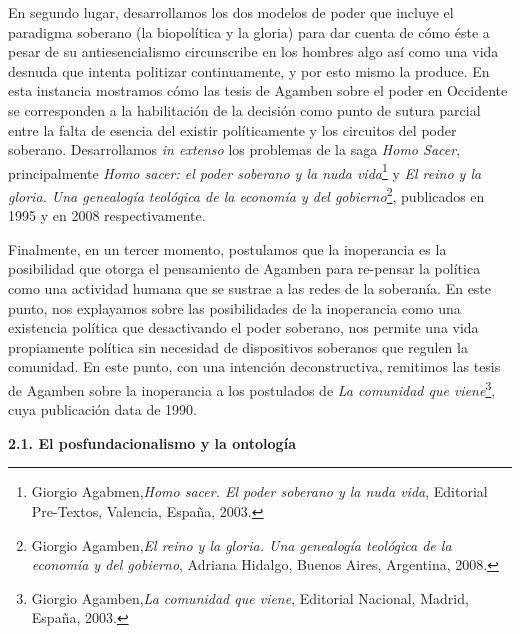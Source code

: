 \documentclass{book}
\begin{document}
En segundo lugar, desarrollamos los dos modelos de poder que incluye el
paradigma soberano (la biopolítica y la gloria) para dar cuenta de cómo
éste a pesar de su antiesencialismo circunscribe en los hombres algo así
como una vida desnuda que intenta politizar continuamente, y por esto
mismo la produce. En esta instancia mostramos cómo las tesis de Agamben
sobre el poder en Occidente se corresponden a la habilitación de la
decisión como punto de sutura parcial entre la falta de esencia del
existir políticamente y los circuitos del poder soberano. Desarrollamos
\emph{in extenso} los problemas de la saga \emph{Homo Sacer},
principalmente \emph{Homo sacer: el poder soberano y la nuda
vida}\footnote{Giorgio Agabmen,\emph{Homo sacer. El poder soberano y la
  nuda vida}, Editorial Pre-Textos, Valencia, España, 2003.} y \emph{El
reino y la gloria. Una genealogía teológica de la economía y del
gobierno}\footnote{Giorgio Agamben,\emph{El reino y la gloria. Una
  genealogía teológica de la economía y del gobierno}, Adriana Hidalgo,
  Buenos Aires, Argentina, 2008.}, publicados en 1995 y en 2008
respectivamente.

Finalmente, en un tercer momento, postulamos que la inoperancia es la
posibilidad que otorga el pensamiento de Agamben para re-pensar la
política como una actividad humana que se sustrae a las redes de la
soberanía. En este punto, nos explayamos sobre las posibilidades de la
inoperancia como una existencia política que desactivando el poder
soberano, nos permite una vida propiamente política sin necesidad de
dispositivos soberanos que regulen la comunidad. En este punto, con una
intención deconstructiva, remitimos las tesis de Agamben sobre la
inoperancia a los postulados de \emph{La comunidad que
viene}\footnote{Giorgio Agamben,\emph{La comunidad que viene}, Editorial
  Nacional, Madrid, España, 2003.}, cuya publicación data de 1990.

\textbf{2.1. El posfundacionalismo y la ontología}
\end{document}
